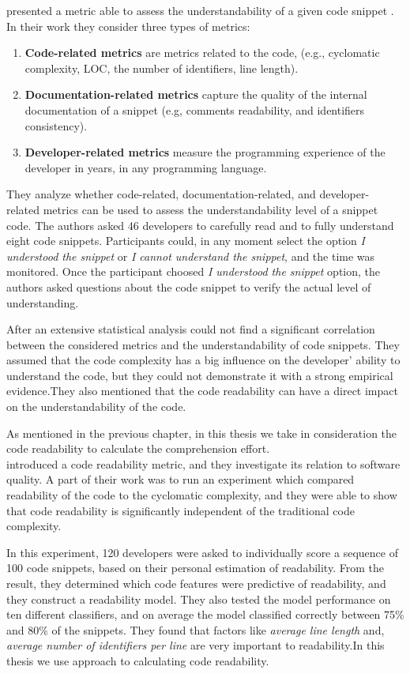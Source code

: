 \documentclass[12pt,mscthesis]{usiinfthesis}
\begin{document}
	\citet{Scalabrino} presented a metric able to assess the understandability of a given code snippet . In their work they consider three types of metrics:
	\begin{enumerate}
		\item \textbf{Code-related metrics} are metrics related to the code, (e.g., cyclomatic complexity, LOC, the number of identifiers, line length).
		\item \textbf{Documentation-related metrics} capture the quality of the internal documentation of a snippet (e.g, comments readability, and identifiers consistency). 
		\item \textbf{Developer-related metrics} measure the programming experience of the developer in years, in any programming language.
	\end{enumerate}
	They analyze whether code-related, documentation-related, and developer- related metrics can be used to assess the understandability level of a snippet  code. The authors asked
	46 developers to carefully read and to fully understand eight code snippets. Participants could, in any moment select the option \textit{I understood the snippet} or \textit{I cannot understand the snippet}, and the time was monitored.
	Once the participant choosed \textit{I understood the snippet} option, the authors asked questions about the code snippet to verify the actual level of understanding.

	After an extensive statistical analysis \citet{Scalabrino} could not find a significant correlation between the considered metrics and the understandability of code snippets.
	They assumed that the code complexity has a big influence on the developer' ability to understand the code, but they could not demonstrate it with a strong empirical evidence.They also mentioned that the code readability can have a direct impact on the understandability of the code.

	As mentioned in the previous chapter, in this thesis we take in consideration the code readability to calculate the comprehension effort.\\

	\citet{Buse2010} introduced a code readability metric, and they investigate its relation to software quality. A part of their work was to run an experiment which compared readability of the code to the cyclomatic complexity, and they were able to show that code readability is significantly independent of the traditional code complexity.


	In this experiment, 120 developers were asked to individually score a sequence of 100 code snippets, based on their personal estimation of readability. From the result, they determined which code features were predictive of readability, and they construct a readability model. They also tested the model performance on ten different classifiers, and on average the model classified correctly between 75\% and 80\% of the snippets. They found that factors like \textit{average line length} and, \textit{average number of identifiers per line} are very important to readability.In this thesis we use \citet{Buse2010} approach to calculating code readability.
\end{document}

